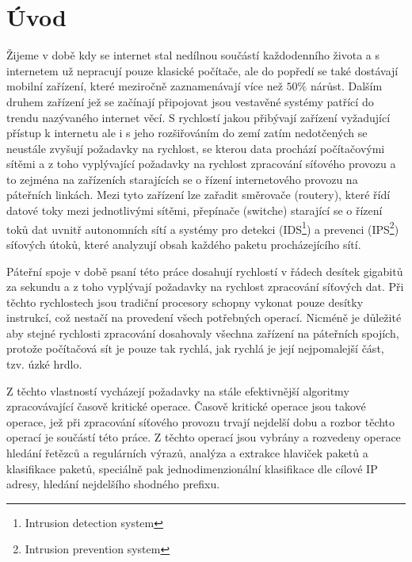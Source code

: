 
\chapter{Úvod} %

Žijeme v době kdy se internet stal nedílnou součástí každodenního života a s internetem už nepracují
pouze klasické počítače, ale do popředí se také dostávají mobilní zařízení, které meziročně
zaznamenávají více než $50\%$ nárůst. Dalším druhem zařízení jež se začínají připojovat
jsou vestavěné systémy patřící do trendu nazývaného internet věcí.
S rychlostí jakou přibývají zařízení vyžadující přístup k internetu ale i s jeho rozšiřováním
do zemí zatím nedotčených se neustále zvyšují požadavky na rychlost, se kterou data prochází počítačovými
sítěmi a z toho vyplývající požadavky na rychlost zpracování síťového provozu a to zejména na zařízeních
starajících se o řízení internetového provozu na páteřních linkách. Mezi tyto
zařízení lze zařadit směrovače (routery), které řídí datové toky mezi jednotlivými sítěmi,
přepínače (switche) starající se o řízení toků dat uvnitř autonomních sítí a
systémy pro detekci (IDS\footnote{Intrusion detection system}) a prevenci (IPS\footnote{Intrusion prevention system})
síťových útoků, které analyzují obsah každého paketu procházejícího sítí.

Páteřní spoje v době psaní této práce dosahují rychlostí v řádech desítek gigabitů
za sekundu a z toho vyplývají požadavky na rychlost zpracování síťových dat. Při těchto rychlostech
jsou tradiční procesory schopny vykonat pouze desítky instrukcí, což nestačí na provedení všech potřebných
operací. Nicméně je důležité aby stejné rychlosti zpracování dosahovaly všechna zařízení na páteřních spojích,
protože počítačová sít je pouze tak rychlá, jak rychlá je její nejpomalejší část, tzv. úzké hrdlo.

Z těchto vlastností vycházejí požadavky na stále efektivnější algoritmy zpracovávající časově kritické operace.
Časově kritické operace jsou takové operace, jež při zpracování síťového provozu trvají nejdelší dobu a rozbor
těchto operací je součástí této práce. Z těchto operací jsou vybrány a rozvedeny operace
hledání řetězců a regulárních výrazů, analýza a extrakce hlaviček paketů a klasifikace paketů, speciálně pak jednodimenzionální klasifikace dle cílové IP adresy, hledání nejdelšího shodného prefixu.

